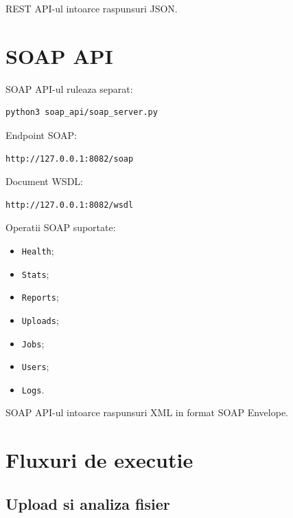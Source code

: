 \documentclass[12pt,a4paper]{article}
\begin{document}
REST API-ul intoarce raspunsuri JSON.

\section{SOAP API}

SOAP API-ul ruleaza separat:

\begin{lstlisting}[style=code]
python3 soap_api/soap_server.py
\end{lstlisting}

Endpoint SOAP:

\begin{lstlisting}[style=code]
http://127.0.0.1:8082/soap
\end{lstlisting}

Document WSDL:

\begin{lstlisting}[style=code]
http://127.0.0.1:8082/wsdl
\end{lstlisting}

Operatii SOAP suportate:

\begin{itemize}
    \item \texttt{Health};
    \item \texttt{Stats};
    \item \texttt{Reports};
    \item \texttt{Uploads};
    \item \texttt{Jobs};
    \item \texttt{Users};
    \item \texttt{Logs}.
\end{itemize}

SOAP API-ul intoarce raspunsuri XML in format SOAP Envelope.

\section{Fluxuri de executie}

\subsection{Upload si analiza fisier}
\end{document}
